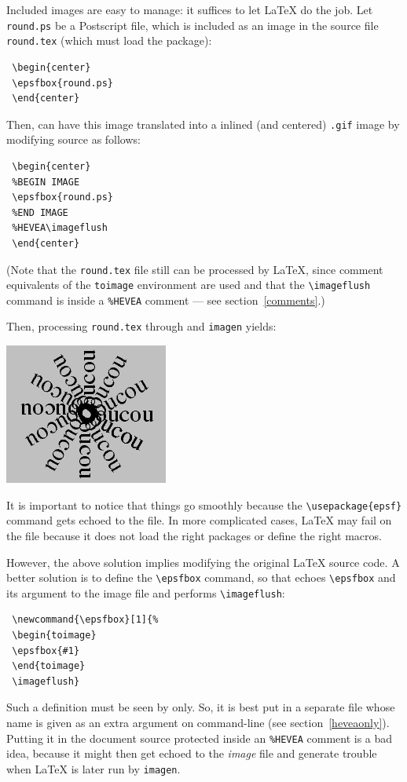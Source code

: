 Included images are easy to manage: it suffices to let \LaTeX{} do the
job.
Let \texttt{round.ps} be a Postscript file, which is included as an
image in the source file \texttt{round.tex} (which must load the
 package):
\begin{verbatim}
 \begin{center}
 \epsfbox{round.ps}
 \end{center}
\end{verbatim}
Then, \hevea{} can have this image translated into a inlined (and
centered) \texttt{.gif} image by modifying source as follows:
\begin{verbatim}
 \begin{center}
 %BEGIN IMAGE
 \epsfbox{round.ps}
 %END IMAGE
 %HEVEA\imageflush
 \end{center}
\end{verbatim}
(Note that the \texttt{round.tex} file
still can be processed by \LaTeX, since comment equivalents
of the \texttt{toimage} environment are used and that
the \verb+\imageflush+ command is  inside
a \verb+%HEVEA+ comment --- see section~\ref{comments}.)

Then, processing \texttt{round.tex} through \hevea{} and
\texttt{imagen} yields:
\begin{htmlout}
\begin{center}
\includegraphics{round}%
\end{center}
\end{htmlout}
It is important to notice that things go smoothly because the
\verb+\usepackage{epsf}+ command  gets echoed to the
 file.  In more complicated cases, \LaTeX{} may fail
on the  file because it does not load the right
packages or define the right macros.


However, the above solution implies modifying the original \LaTeX{}
source code.
A better solution is to define the \verb+\epsfbox+
command, so that \hevea{} echoes  \verb+\epsfbox+ and its argument to
the image file and performs \verb+\imageflush+:
\begin{verbatim}
 \newcommand{\epsfbox}[1]{%
 \begin{toimage}
 \epsfbox{#1}
 \end{toimage}
 \imageflush}
\end{verbatim}
Such a definition must be seen by \hevea{} only. So, it is best put
in a separate file whose name is given as an extra argument on
\hevea{} command-line (see section~\ref{heveaonly}).
Putting it in the document source
protected inside an \verb+%HEVEA+ comment is a bad idea, %
because it might then get echoed to the \textit{image} file
and generate trouble when \LaTeX{} is later run by \texttt{imagen}.

